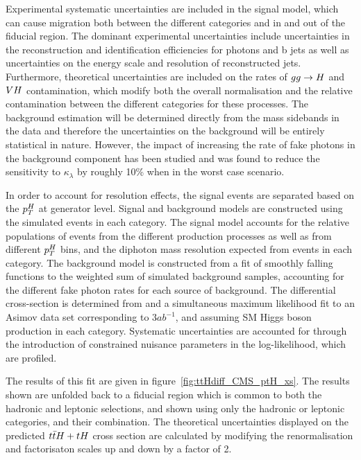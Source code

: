 Experimental systematic uncertainties are included in the signal model, which can cause migration both between the different categories and in and out of the fiducial region. The dominant experimental uncertainties include uncertainties in the reconstruction and 
identification efficiencies for photons and b jets as well as uncertainties on the energy scale and resolution of reconstructed jets. 
Furthermore, theoretical uncertainties are included on the rates of $gg\rightarrow H$ and $VH$ contamination, which modify both the overall normalisation and the relative contamination between the different categories for these processes. The background estimation will be determined directly from the mass sidebands in the data and therefore the uncertainties on the background will be entirely statistical in nature. However, the impact of increasing the rate of fake photons in the background component has been studied and was found to reduce the sensitivity to $\kappa_\lambda$ by roughly 10\% when in the worst case scenario.  


In order to account for resolution effects, the signal events are separated based on the $p_{T}^{H}$ at generator level.   Signal and background models are constructed using the simulated events in each category. The signal model accounts for the relative populations of events from the different production processes as well as from different $p_{T}^{H}$ bins, and the diphoton mass resolution expected from events in each category. The background model is constructed from a fit of smoothly falling functions to the weighted sum of simulated background samples, accounting for the different fake photon rates for each source of background. The differential cross-section is determined from and a simultaneous maximum likelihood fit to an Asimov data set corresponding to $3ab^{-1}$, and assuming SM Higgs boson  production in each category.  Systematic uncertainties are accounted for through the introduction of constrained nuisance parameters in the log-likelihood, which are profiled. 

The results of this fit are given in figure~\ref{fig:ttHdiff_CMS_ptH_xs}. The results shown are unfolded back to a fiducial region which is common to both the hadronic and leptonic selections, and shown using only the hadronic or leptonic categories, and their combination. The theoretical uncertainties displayed on the predicted $t\bar{t}H+tH$ cross section are calculated by modifying the renormalisation and factorisaton scales up and down by a factor of 2.

